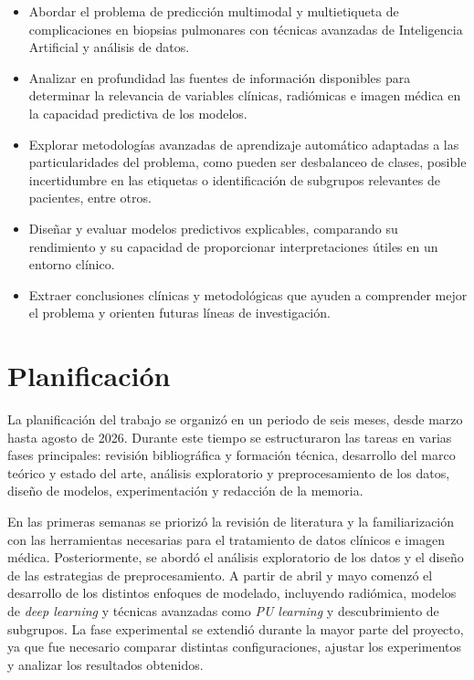 \begin{itemize}
    \item Abordar el problema de predicción multimodal y multietiqueta de complicaciones en biopsias pulmonares con técnicas avanzadas de Inteligencia Artificial y análisis de datos.
    \item Analizar en profundidad las fuentes de información disponibles para determinar la relevancia de variables clínicas, radiómicas e imagen médica en la capacidad predictiva de los modelos.
    \item Explorar metodologías avanzadas de aprendizaje automático adaptadas a las particularidades del problema, como pueden ser desbalanceo de clases, posible incertidumbre en las etiquetas o identificación de subgrupos relevantes de pacientes, entre otros.
    \item Diseñar y evaluar modelos predictivos explicables, comparando su rendimiento y su capacidad de proporcionar interpretaciones útiles en un entorno clínico.
    \item Extraer conclusiones clínicas y metodológicas que ayuden a comprender mejor el problema y orienten futuras líneas de investigación.
\end{itemize}



\section{Planificación}

La planificación del trabajo se organizó en un periodo de seis meses, desde marzo hasta agosto de 2026. Durante este tiempo se estructuraron las tareas en varias fases principales: revisión bibliográfica y formación técnica, desarrollo del marco teórico y estado del arte, análisis exploratorio y preprocesamiento de los datos, diseño de modelos, experimentación y redacción de la memoria.

En las primeras semanas se priorizó la revisión de literatura y la familiarización con las herramientas necesarias para el tratamiento de datos clínicos e imagen médica. Posteriormente, se abordó el análisis exploratorio de los datos y el diseño de las estrategias de preprocesamiento. A partir de abril y mayo comenzó el desarrollo de los distintos enfoques de modelado, incluyendo radiómica, modelos de \textit{deep learning} y técnicas avanzadas como \textit{PU learning} y descubrimiento de subgrupos. La fase experimental se extendió durante la mayor parte del proyecto, ya que fue necesario comparar distintas configuraciones, ajustar los experimentos y analizar los resultados obtenidos.

